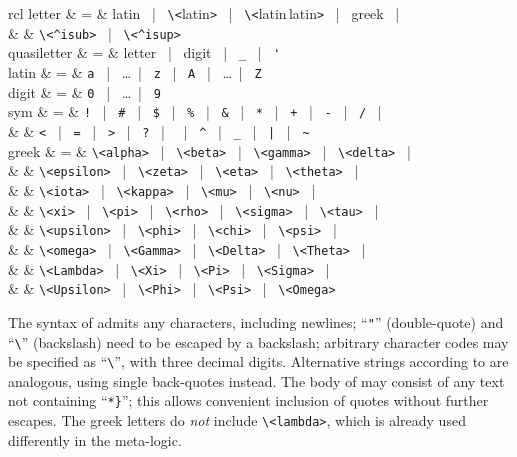 \begin{isabellebody}
\begin{isamarkuptext}
\begin{matharray}{rcl}
    letter & = & latin ~|~ \verb,\,\verb,<,latin\verb,>, ~|~ \verb,\,\verb,<,latin\,latin\verb,>, ~|~ greek ~|~ \\
           &   & \verb,\<^isub>, ~|~ \verb,\<^isup>, \\
    quasiletter & = & letter ~|~ digit ~|~ \verb,_, ~|~ \verb,', \\
    latin & = & \verb,a, ~|~ \dots ~|~ \verb,z, ~|~ \verb,A, ~|~ \dots ~|~ \verb,Z, \\
    digit & = & \verb,0, ~|~ \dots ~|~ \verb,9, \\
    sym & = & \verb,!, ~|~ \verb,#, ~|~ \verb,$, ~|~ \verb,%, ~|~ \verb,&, ~|~
     \verb,*, ~|~ \verb,+, ~|~ \verb,-, ~|~ \verb,/, ~|~ \\
    & & \verb,<, ~|~ \verb,=, ~|~ \verb,>, ~|~ \verb,?, ~|~ \texttt{\at} ~|~
    \verb,^, ~|~ \verb,_, ~|~ \verb,|, ~|~ \verb,~, \\
    greek & = & \verb,\<alpha>, ~|~ \verb,\<beta>, ~|~ \verb,\<gamma>, ~|~ \verb,\<delta>, ~| \\
          &   & \verb,\<epsilon>, ~|~ \verb,\<zeta>, ~|~ \verb,\<eta>, ~|~ \verb,\<theta>, ~| \\
          &   & \verb,\<iota>, ~|~ \verb,\<kappa>, ~|~ \verb,\<mu>, ~|~ \verb,\<nu>, ~| \\
          &   & \verb,\<xi>, ~|~ \verb,\<pi>, ~|~ \verb,\<rho>, ~|~ \verb,\<sigma>, ~|~ \verb,\<tau>, ~| \\
          &   & \verb,\<upsilon>, ~|~ \verb,\<phi>, ~|~ \verb,\<chi>, ~|~ \verb,\<psi>, ~| \\
          &   & \verb,\<omega>, ~|~ \verb,\<Gamma>, ~|~ \verb,\<Delta>, ~|~ \verb,\<Theta>, ~| \\
          &   & \verb,\<Lambda>, ~|~ \verb,\<Xi>, ~|~ \verb,\<Pi>, ~|~ \verb,\<Sigma>, ~| \\
          &   & \verb,\<Upsilon>, ~|~ \verb,\<Phi>, ~|~ \verb,\<Psi>, ~|~ \verb,\<Omega>, \\
  \end{matharray}

  The syntax of \mbox{} admits any characters, including
  newlines; ``\verb|"|'' (double-quote) and ``\verb|\|'' (backslash) need to be escaped by a backslash; arbitrary
  character codes may be specified as ``\verb|\|'',
  with three decimal digits.  Alternative strings according to
  \mbox{} are analogous, using single back-quotes instead.
  The body of \mbox{} may consist of any text not
  containing ``\verb|*|\verb|}|''; this allows
  convenient inclusion of quotes without further escapes.  The greek
  letters do \emph{not} include \verb|\<lambda>|, which is already used
  differently in the meta-logic.


\end{isamarkuptext}
\end{isabellebody}
